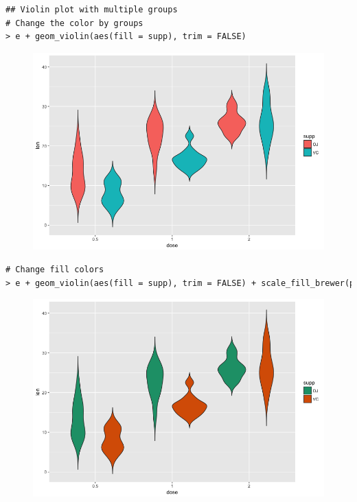 \begin{lstlisting}[language=html]
## Violin plot with multiple groups
# Change the color by groups
> e + geom_violin(aes(fill = supp), trim = FALSE)
\end{lstlisting}
\begin{figure}[H]\begin{center}\includegraphics[scale=1 ]{ilu/bg99.png}\end{center}\end{figure}
\begin{lstlisting}[language=html]
# Change fill colors
> e + geom_violin(aes(fill = supp), trim = FALSE) + scale_fill_brewer(palette = "Dark2")
\end{lstlisting}
\begin{figure}[H]\begin{center}\includegraphics[scale=1 ]{ilu/bg100.png}\end{center}\end{figure}

